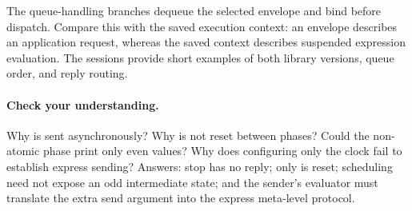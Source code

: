 The queue-handling branches dequeue the selected envelope and bind
 before dispatch. Compare this with the
saved execution context: an envelope describes an application request,
whereas the saved context describes suspended expression evaluation.
The  sessions provide short examples of both
library versions, queue order, and reply routing.

\paragraph{Check your understanding.}
Why is  sent asynchronously? Why is  not reset
between phases? Could the non-atomic phase print only even values? Why
does configuring only the clock fail to establish express sending?
Answers: stop has no reply; only  is reset; scheduling need
not expose an odd intermediate state; and the sender's evaluator must
translate the extra send argument into the express meta-level protocol.
